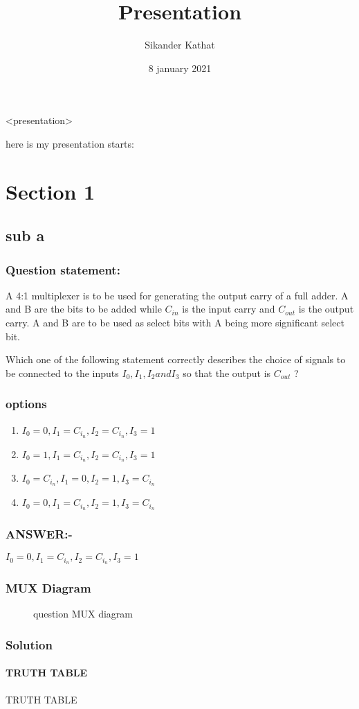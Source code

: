 \documentclass{beamer}
\title{Presentation}
\author{Sikander Kathat}
\institute{IIIT Raichur}
\date{8 january 2021}
\begin{document}
<presentation>


\titlepage here is my presentation starts:
 \section{Section 1}
\subsection{sub a}

\begin{frame}
\frametitle{Question statement:}

A 4:1 multiplexer is to be used for generating the output carry of a full adder. A and B are the bits to be added while $C_{in}$ is the input carry and $C_{out}$ is the output carry. A and B are to be used as select bits with A being more significant select bit.

Which one of the following statement correctly describes the choice of signals to be connected to the inputs  $ I_0, I_1, I_2 and I_3 $  so that the output is $C_{out}$  ?
\end{frame}

\begin{frame}
\frametitle{options}
\begin{enumerate}
    \item$I_0=0,  I_1=C_i_n,  I_2=C_i_n,  I_3=1$
    \item$I_0=1,  I_1=C_i_n,  I_2=C_i_n,  I_3=1$
    \item$I_0=C_i_n,  I_1=0,  I_2=1,  I_3=C_i_n$
    \item$I_0=0,  I_1=C_i_n,  I_2=1,  I_3=C_i_n$
\end{enumerate}
    
\end{frame}
 
 \begin{frame}
\frametitle{ANSWER:-}
 $I_0=0,  I_1=C_i_n,  I_2=C_i_n,  I_3=1$
 
 \end{frame}
 
  \begin{frame}
\frametitle{MUX Diagram}
 \begin{figure}[!ht]
\centering
{

}
\caption{question MUX diagram}
\label{MUX diagram)}
\end{figure}
\end{frame}
 
   \begin{frame}
\frametitle{Solution}
\framesubtitle{TRUTH TABLE}
  \begin{table}[!ht]
\centering
{

}
\caption{TRUTH TABLE}
\label{table}
\end{table}
  \end{frame}
  
\end{document}
